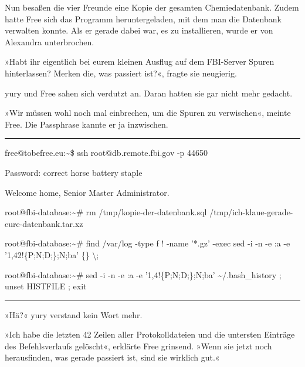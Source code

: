 Nun besaßen die vier Freunde eine Kopie der gesamten Chemiedatenbank. Zudem hatte Free sich das Programm heruntergeladen, mit dem man die Datenbank verwalten konnte. Als er gerade dabei war, es zu installieren, wurde er von Alexandra unterbrochen.

»Habt ihr eigentlich bei eurem kleinen Ausflug auf dem FBI-Server Spuren hinterlassen? Merken die, was passiert ist?«, fragte sie neugierig.

yury und Free sahen sich verdutzt an. Daran hatten sie gar nicht mehr gedacht.

»Wir müssen wohl noch mal einbrechen, um die Spuren zu verwischen«, meinte Free. Die Passphrase kannte er ja inzwischen.

\noindent \parbox{\textwidth}{ \vspace{3ex} \hrule \vspace{3ex}

    \begin{footnotesize}
    \begin{ttfamily}

\noindent free@tobefree.eu:\textasciitilde{}\$ ssh root@db.remote.fbi.gov -p 44650

\noindent Password: correct horse battery staple

\noindent Welcome home, Senior Master Administrator.

\noindent root@fbi-database:\textasciitilde{}\# rm /tmp/kopie-der-datenbank.sql /tmp/ich-klaue-gerade-eure-datenbank.tar.xz

\noindent root@fbi-database:\textasciitilde{}\# find /var/log -type f ! -name '*.gz' -exec sed -i -n -e :a -e '1,42!\{P;N;D;\};N;ba' \{\} \textbackslash{};

\noindent root@fbi-database:\textasciitilde{}\# sed -i -n -e :a -e '1,4!\{P;N;D;\};N;ba' \textasciitilde{}/.bash\_history ; unset HISTFILE ; exit

    \end{ttfamily}
    \end{footnotesize}

\vspace{3ex} \hrule \vspace{3ex} }

»Hä?« yury verstand kein Wort mehr.

»Ich habe die letzten 42 Zeilen aller Protokolldateien und die untersten Einträge des Befehlsverlaufs gelöscht«, erklärte Free grinsend. »Wenn sie jetzt noch herausfinden, was gerade passiert ist, sind sie wirklich gut.«

